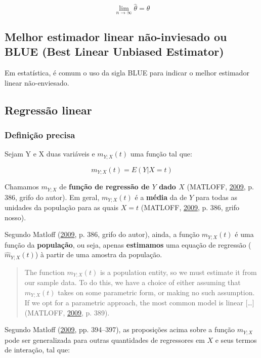 \documentclass[a4paper]{article}
\begin{document}
\[\lim_{n \rightarrow \infty}\hat{\theta} = \theta\]

\subsection{Melhor estimador linear não-inviesado ou BLUE (Best Linear
Unbiased
Estimator)}\label{melhor-estimador-linear-nao-inviesado-ou-blue-best-linear-unbiased-estimator}

Em estatística, é comum o uso da sigla BLUE para indicar o melhor
estimador linear não-enviesado.

\subsection{Regressão linear}\label{regressao-linear}

\subsubsection{Definição precisa}\label{definicao-precisa}

Sejam Y e X duas variáveis e \(m_{Y;X}(t)\) uma função tal que:

\[m_{Y;X}(t) = E(Y|X = t)\]

Chamamos \(m_{Y;X}\) de \textbf{função de regressão de \(Y\) dado \(X\)}
(MATLOFF, \protect\hyperlink{ref-matloff2009}{2009}, p. 386, grifo do
autor). Em geral, \(m_{Y;X}(t)\) é a \textbf{média} da de \(Y\) para
todas as unidades da população para as quais \(X = t\) (MATLOFF,
\protect\hyperlink{ref-matloff2009}{2009}, p. 386, grifo nosso).

Segundo Matloff (\protect\hyperlink{ref-matloff2009}{2009}, p. 386,
grifo do autor), ainda, a função \(m_{Y;X}(t)\) é uma função da
\textbf{população}, ou seja, apenas \textbf{estimamos} uma equação de
regressão (\(\hat{m}_{Y;X}(t)\)) à partir de uma amostra da população.

\begin{quote}
The function \(m_{Y;X}(t)\) is a population entity, so we must estimate
it from our sample data. To do this, we have a choice of either assuming
that \(m_{Y;X}(t)\) takes on some parametric form, or making no such
assumption. If we opt for a parametric approach, the most common model
is linear {[}\ldots{}{]} (MATLOFF,
\protect\hyperlink{ref-matloff2009}{2009}, p. 389).
\end{quote}

Segundo Matloff (\protect\hyperlink{ref-matloff2009}{2009}, pp.
394--397), as proposições acima sobre a função \(m_{Y;X}\) pode ser
generalizada para outras quantidades de regressores em \(X\) e seus
termos de interação, tal que:
\end{document}
